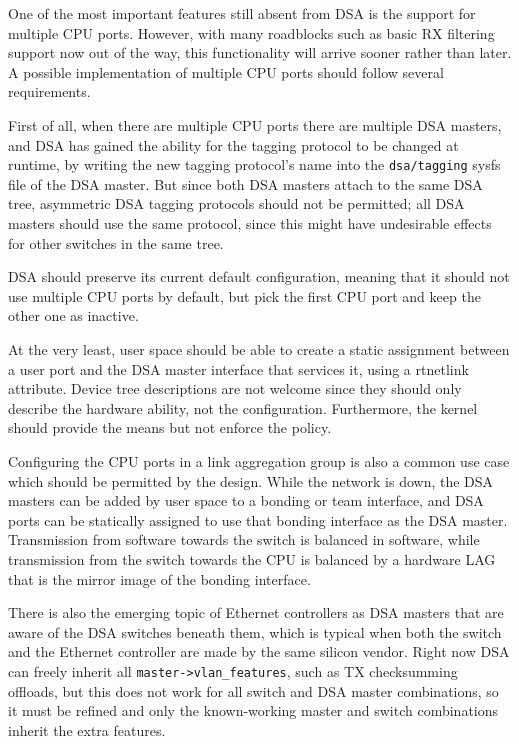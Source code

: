 \documentclass[letterpaper]{article}
\begin{document}
One of the most important features still absent from DSA is the support for
multiple CPU ports. However, with many roadblocks such as basic RX filtering
support now out of the way, this functionality will arrive sooner rather than
later. A possible implementation of multiple CPU ports should follow several
requirements.

First of all, when there are multiple CPU ports there are multiple DSA masters,
and DSA has gained the ability for the tagging protocol to be changed at
runtime, by writing the new tagging protocol's name into the \verb|dsa/tagging|
sysfs file of the DSA master. But since both DSA masters attach to the same DSA
tree, asymmetric DSA tagging protocols should not be permitted; all DSA masters
should use the same protocol, since this might have undesirable effects for
other switches in the same tree.

DSA should preserve its current default configuration, meaning that it should
not use multiple CPU ports by default, but pick the first CPU port and keep the
other one as inactive.

At the very least, user space should be able to create a static assignment
between a user port and the DSA master interface that services it, using a
rtnetlink attribute. Device tree descriptions are not welcome since they should
only describe the hardware ability, not the configuration. Furthermore, the
kernel should provide the means but not enforce the policy.

Configuring the CPU ports in a link aggregation group is also a common use
case which should be permitted by the design. While the network is down, the
DSA masters can be added by user space to a bonding or team interface, and DSA
ports can be statically assigned to use that bonding interface as the DSA master.
Transmission from software towards the switch is balanced in software, while
transmission from the switch towards the CPU is balanced by a hardware LAG that
is the mirror image of the bonding interface.

There is also the emerging topic of Ethernet controllers as DSA masters that
are aware of the DSA switches beneath them, which is typical when both the
switch and the Ethernet controller are made by the same silicon vendor.
Right now DSA can freely inherit all \verb|master->vlan_features|, such as TX
checksumming offloads, but this does not work for all switch and DSA master
combinations, so it must be refined and only the known-working master and
switch combinations inherit the extra features.
\end{document}
